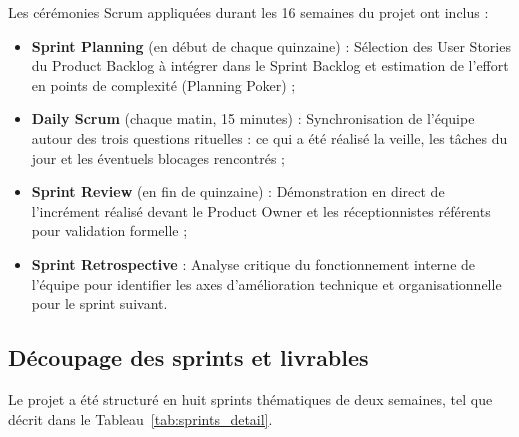 \documentclass[12pt,a4paper,oneside]{report}
\begin{document}
Les cérémonies Scrum appliquées durant les 16 semaines du projet ont inclus :
\begin{itemize}
    \item \textbf{Sprint Planning} (en début de chaque quinzaine) : Sélection des User Stories du Product Backlog à intégrer dans le Sprint Backlog et estimation de l'effort en points de complexité (Planning Poker) ;
    \item \textbf{Daily Scrum} (chaque matin, 15 minutes) : Synchronisation de l'équipe autour des trois questions rituelles : ce qui a été réalisé la veille, les tâches du jour et les éventuels blocages rencontrés ;
    \item \textbf{Sprint Review} (en fin de quinzaine) : Démonstration en direct de l'incrément réalisé devant le Product Owner et les réceptionnistes référents pour validation formelle ;
    \item \textbf{Sprint Retrospective} : Analyse critique du fonctionnement interne de l'équipe pour identifier les axes d'amélioration technique et organisationnelle pour le sprint suivant.
\end{itemize}

\subsection{Découpage des sprints et livrables}

Le projet a été structuré en huit sprints thématiques de deux semaines, tel que décrit dans le Tableau~\ref{tab:sprints_detail}.
\end{document}
